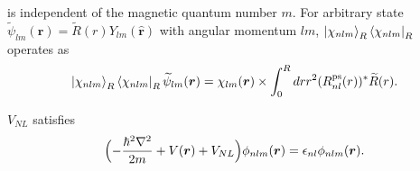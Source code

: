 \documentclass{article}
\begin{document}
is independent of the magnetic quantum number $m$.
For arbitrary state $\widetilde{\psi}_{lm}(\bm{r}) = \widetilde{R}(r) Y_{lm}(\hat{\bm{r}})$ with angular momentum $lm$, $\ket{\chi_{nlm}}_R\bra{\chi_{nlm}}_R$ operates as
\begin{align}
  \ket{\chi_{nlm}}_R\bra{\chi_{nlm}}_R \widetilde{\psi}_{lm}(\bm{r}) 
  = 
  \chi_{lm}({\bm{r}}) \times \int_0^R dr r^2 (R^{\text{ps}}_{nl}(r))^* \widetilde{R}(r).
\end{align}

$V_{NL}$ satisfies
\begin{align}
 \Bigl( - \frac{\hbar^2\nabla^2}{2m} + V(\bm{r}) + V_{NL}\Bigr) \phi_{nlm}(\bm{r}) = \epsilon_{nl} \phi_{nlm}(\bm{r}).
\end{align}
\end{document}
